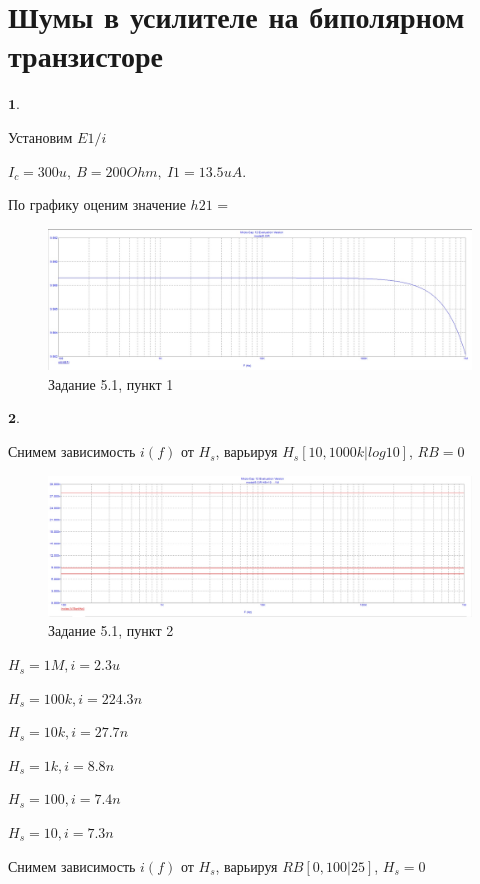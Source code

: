 \documentclass[a4paper, 14pt]{extarticle}%
\begin{document}
\newpage

\section{Шумы в усилителе на биполярном транзисторе}

$\textbf{1.}$


Установим ${E1/i}$

$I_c = 300u, \:B = 200Ohm, \: I1 = 13.5uA.$

По графику оценим значение $h21$ =

\begin{figure}[h!]
			\centering
			\includegraphics[width=1.1\linewidth]{5/5_1_1.jpg}
			\caption{Задание 5.1, пункт 1}
			\label{A}
\end{figure}

$\textbf{2.}$

Снимем зависимость $i(f)$ от $H_s$, варьируя $H_s[10, 1000k|log10]$, $RB = 0$

\begin{figure}[h!]
			\centering
			\includegraphics[width=1.1\linewidth]{5/5_1_2.jpg}
			\caption{Задание 5.1, пункт 2}
			\label{A}
\end{figure}

$H_s = 1M, i = 2.3u$

$H_s = 100k, i = 224.3n$

$H_s = 10k, i = 27.7n$

$H_s = 1k, i = 8.8n$

$H_s = 100, i = 7.4n$

$H_s = 10, i = 7.3n$

Снимем зависимость $i(f)$ от $H_s$, варьируя $RB[0, 100|25]$, $H_s = 0$
\end{document}
